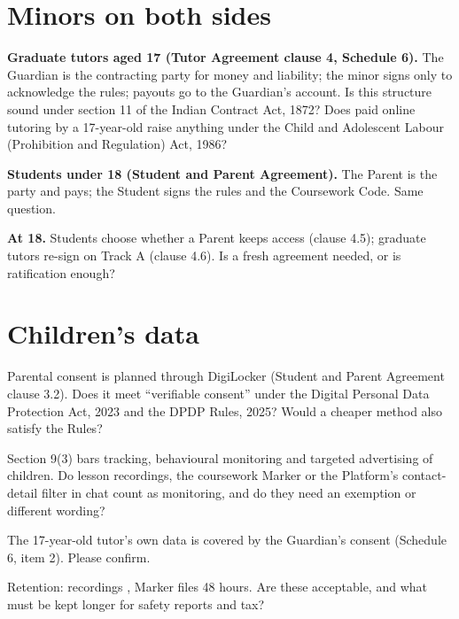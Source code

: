 \documentclass[11pt]{article}
\begin{document}


\section{Minors on both sides}
\begin{clauses}
  \item \textbf{Graduate tutors aged 17 (Tutor Agreement clause 4, Schedule 6).} The Guardian is the contracting party for money and liability; the minor signs only to acknowledge the rules; payouts go to the Guardian's account. Is this structure sound under section 11 of the Indian Contract Act, 1872? Does paid online tutoring by a 17-year-old raise anything under the Child and Adolescent Labour (Prohibition and Regulation) Act, 1986?
  \item \textbf{Students under 18 (Student and Parent Agreement).} The Parent is the party and pays; the Student signs the rules and the Coursework Code. Same question.
  \item \textbf{At 18.} Students choose whether a Parent keeps access (clause 4.5); graduate tutors re-sign on Track A (clause 4.6). Is a fresh agreement needed, or is ratification enough?
\end{clauses}

\section{Children's data}
\begin{clauses}
  \item Parental consent is planned through DigiLocker (Student and Parent Agreement clause 3.2). Does it meet ``verifiable consent'' under the Digital Personal Data Protection Act, 2023 and the DPDP Rules, 2025? Would a cheaper method also satisfy the Rules?
  \item Section 9(3) bars tracking, behavioural monitoring and targeted advertising of children. Do lesson recordings, the coursework Marker or the Platform's contact-detail filter in chat count as monitoring, and do they need an exemption or different wording?
  \item The 17-year-old tutor's own data is covered by the Guardian's consent (Schedule 6, item 2). Please confirm.
  \item Retention: recordings , Marker files 48 hours. Are these acceptable, and what must be kept longer for safety reports and tax?
\end{clauses}
\end{document}
